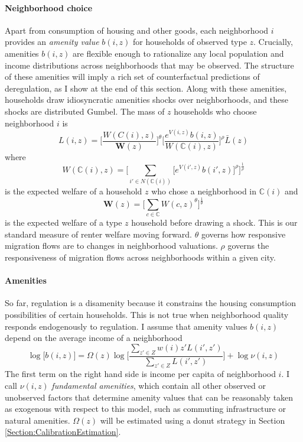 \documentclass[11pt]{article}
\begin{document}
	\paragraph*{Neighborhood choice} 
	Apart from consumption of housing and other goods, each neighborhood $i$ provides an \textit{amenity value} $b(i, z)$ for households of observed type $z$. Crucially, amenities $b(i, z)$ are flexible enough to rationalize any local population and income distributions across neighborhoods that may be observed. The structure of these amenities will imply a rich set of counterfactual predictions of deregulation, as I show at the end of this section. Along with these amenities, households draw idiosyncratic amenities shocks over neighborhoods, and these shocks are distributed Gumbel. The mass of $z$ households who choose neighborhood $i$ is 
	\begin{equation}\label{laboursupply}
	L(i, z) = \bigg[\frac{W(C(i), z)}{\boldsymbol{W}(z)}\bigg]^{\theta}\bigg[\frac{e^{V(i, z)}b(i, z)}{W(\mathbb{C}(i), z)}\bigg]^{\rho}\bar{L}(z)
	\end{equation}
	where
	\begin{equation*}
	W(\mathbb{C}(i), z) = \bigg[\sum_{i' \in N(\mathbb{C}(i))}\big[e^{V(i', z)}b(i', z)\big]^{\rho}\bigg]^{\frac{1}{\rho}}
	\end{equation*} 
	is the expected welfare of a household $z$ who chose a neighborhood in $\mathbb{C}(i)$ and 
	\begin{equation}\label{Welfare}
		\boldsymbol{W}(z) = \bigg[\sum_{c \in \mathbb{C}} W(c, z)^{\theta}\bigg]^{\frac{1}{\theta}}	
	\end{equation}
	is the expected welfare of a type $z$ household before drawing a shock.  This is our standard measure of renter welfare moving forward. $\theta$ governs how responsive migration flows are to changes in neighborhood valuations. $\rho$ governs the responsiveness of migration flows across neighborhoods within a given city. 
 
	\paragraph*{Amenities} So far, regulation is a disamenity because it constrains the housing consumption possibilities of certain households. This is not true when neighborhood quality responds endogenously to regulation. I assume that amenity values $b(i, z)$ depend on the average income of a neighborhood
	\begin{equation}\label{endoamen}
		\log\big[b(i, z)\big] = \Omega(z)\log\bigg[\frac{\sum_{z' \in Z}w(i)z'L(i', z')}{\sum_{z' \in Z}L(i', z')}\bigg] + \log \nu(i, z)
	\end{equation}
	 The first term on the right hand side is income per capita of neighborhood $i$. I call $\nu(i, z)$ \textit{fundamental amenities}, which contain all other observed or unobserved factors that determine amenity values that can be reasonably taken as exogenous with respect to this model, such as commuting infrastructure or natural amenities. $\Omega(z)$ will be estimated using a donut strategy in Section \ref{Section:CalibrationEstimation}. 
\end{document}
